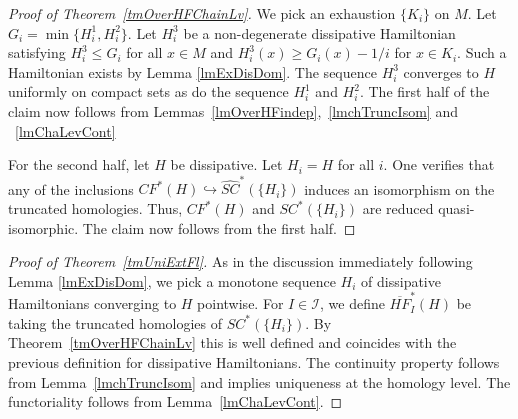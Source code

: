 \documentclass[11pt]{amsart}
\theoremstyle{definition}
\theoremstyle{remark}
\begin{document}
\begin{proof}[Proof of Theorem~\ref{tmOverHFChainLv}]
 We pick an exhaustion $\{K_i\}$ on $M$. Let $G_i=\min\{ H^1_i,H^2_i\}$. Let $H^3_i$ be a non-degenerate dissipative Hamiltonian satisfying $H^3_i\leq G_i$ for all $x\in M$ and $H^3_i(x)\geq G_i(x)-1/i$ for $x\in K_i$. Such a Hamiltonian exists by Lemma \ref{lmExDisDom}. The sequence $H^3_i$ converges to $H$ uniformly on compact sets as do the sequence $H^1_i$ and $H_i^2$. The first half of the claim now follows from Lemmas~\ref{lmOverHFindep},~\ref{lmchTruncIsom} and ~\ref{lmChaLevCont}

For the second half, let $H$ be dissipative. Let $H_i=H$ for all $i$. One verifies that any of the inclusions $CF^*(H)\hookrightarrow \widehat{SC}^*(\{H_i\})$ induces an isomorphism on the truncated homologies. Thus, ${CF}^*(H)$ and $SC^*(\{H_i\})$ are reduced quasi-isomorphic. The claim now follows from the first half.

\end{proof}
\begin{proof}[Proof of Theorem~\ref{tmUniExtFl}]
As in the discussion immediately following Lemma \ref{lmExDisDom}, we pick a monotone sequence $H_i$ of dissipative Hamiltonians converging to $H$ pointwise. For $I\in\mathcal{I}$, we define $\overline{HF}_I^*(H)$ be taking the truncated homologies of $SC^*(\{H_i\})$. By Theorem~\ref{tmOverHFChainLv} this is well defined and coincides with the previous definition for dissipative Hamiltonians. The continuity property follows from Lemma~\ref{lmchTruncIsom} and implies uniqueness at the homology level. The functoriality follows from Lemma~\ref{lmChaLevCont}.
\end{proof}
\end{document}
